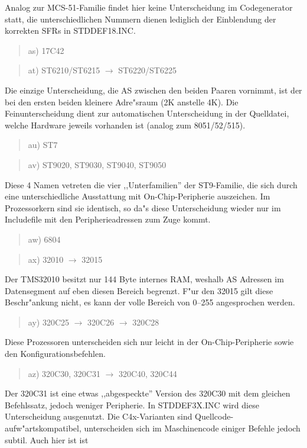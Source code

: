 \documentclass[12pt,a4paper,twoside]{report}
\begin{document}
Analog zur MCS-51-Familie findet hier keine Unterscheidung im
Codegenerator statt, die unterschiedlichen Nummern dienen lediglich
der Einblendung der korrekten SFRs in STDDEF18.INC.
\begin{quote}
as) 17C42
\end{quote}
\begin{quote}
at) ST6210/ST6215 $\rightarrow$ ST6220/ST6225
\end{quote}
Die einzige Unterscheidung, die AS zwischen den beiden Paaren vornimmt, ist
der bei den ersten beiden kleinere Adre"sraum (2K anstelle 4K).  Die
Feinunterscheidung dient zur automatischen Unterscheidung in der Quelldatei,
welche Hardware jeweils vorhanden ist (analog zum 8051/52/515).
\begin{quote}
au) ST7
\end{quote}
\begin{quote}
av) ST9020, ST9030, ST9040, ST9050
\end{quote}
Diese 4 Namen vetreten die vier ,,Unterfamilien'' der ST9-Familie, die
sich durch eine unterschiedliche Ausstattung mit On-Chip-Peripherie
auszeichen.  Im Prozessorkern sind sie identisch, so da"s diese
Unterscheidung wieder nur im Includefile mit den Peripherieadressen zum
Zuge kommt.
\begin{quote}
aw) 6804
\end{quote}
\begin{quote}
ax) 32010 $\rightarrow$ 32015
\end{quote}
Der TMS32010 besitzt nur 144 Byte internes RAM, weshalb AS Adressen im
Datensegment auf eben diesen Bereich begrenzt.  F"ur den 32015 gilt diese
Beschr"ankung nicht, es kann der volle Bereich von 0--255 angesprochen
werden.
\begin{quote}
ay) 320C25 $\rightarrow$ 320C26 $\rightarrow$ 320C28
\end{quote}
Diese Prozessoren unterscheiden sich nur leicht in der
On-Chip-Peripherie sowie den Konfigurationsbefehlen.
\begin{quote}
az) 320C30, 320C31 $\rightarrow$ 320C40, 320C44
\end{quote}
Der 320C31 ist eine etwas ,,abgespeckte'' Version des 320C30 mit dem
gleichen Befehlssatz, jedoch weniger Peripherie.  In STDDEF3X.INC
wird diese Unterscheidung ausgenutzt.  Die C4x-Varianten sind
Quellcode-aufw"artskompatibel, unterscheiden sich im
Maschinencode einiger Befehle jedoch subtil.  Auch hier ist ist
\end{document}
